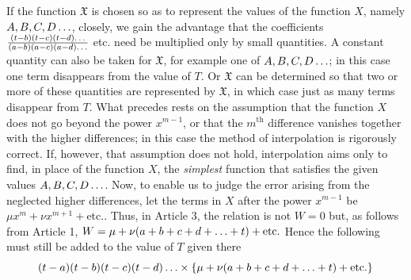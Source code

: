 If the function $\mathfrak{X}$ is chosen so as to represent the values of the function $X$, namely $A,B,C,D\mathinner{.\,.\,.}$,
closely, we gain the advantage that the coefficients
$\frac{(t-b)(t-c)(t-d)\mathinner{.\,.\,.}}{(a-b)(a-c)(a-d)\mathinner{.\,.\,.}}$ etc.
need be multiplied only by small quantities. A constant quantity can also be taken for $\mathfrak{X}$,
for example one of $A,B,C,D\mathinner{.\,.\,.}$; in this case one term disappears from the value of
$T$. Or $\mathfrak{X}$ can be determined so that two or more of these quantities
are represented by $\mathfrak{X}$, in which case just as many terms disappear from $T$.
What precedes rests on the assumption that the function $X$ does not go beyond the power
$x^{m-1}$, or that the $m^{\mathrm{th}}$ difference vanishes together with the higher differences; in
this case the method of interpolation is rigorously correct. If, however, that assumption
does not hold, interpolation aims only to find, in place of the function $X$, the \textit{simplest} function that satisfies the given values $A,B,C,D\mathinner{.\,.\,.}$. Now,
to enable us to judge the error arising from the neglected higher differences,
let the terms in \(X\) after the power \(x^{m-1}\) be \(\mu x^m+\nu x^{m+1}+\text{etc.}\). Thus, in Article 3,
the relation is not \(W=0\) but, as follows from Article 1, \(W=\mu+\nu(a+b+c+d+\mathinner{.\,.\,.}+t)+\text{etc.}\)
Hence the following must still be added to the value of \(T\) given there
\[
(t-a)(t-b)(t-c)(t-d)\mathinner{.\,.\,.}\times\{\mu+\nu(a+b+c+d+\mathinner{.\,.\,.}+t)+\text{etc.}\}
\]

\endgroup
